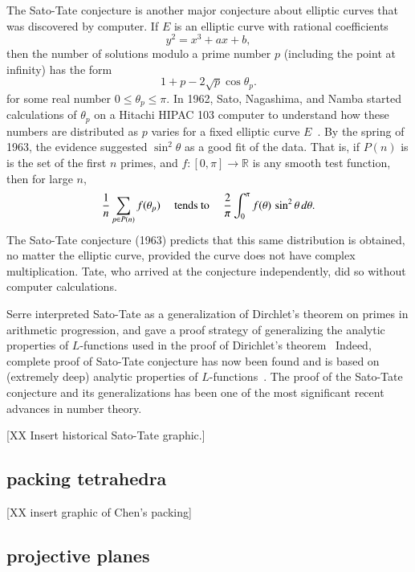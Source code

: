 \documentclass{llncs}
\newcommand{\ring}[1]{\mathbb{#1}}
\begin{document}
The Sato-Tate conjecture is another major conjecture about elliptic
curves that was discovered by computer.  If $E$ is an elliptic curve
with rational coefficients
\[
y^2 = x^3 + a x + b,
\]
then the number of solutions modulo a prime number $p$ (including the
point at infinity) has the form
\[
1 + p - 2\sqrt{p}\cos\theta_p.
\]
for some real number $0\le \theta_p\le \pi$.  In 1962, Sato,
Nagashima, and Namba started calculations  of $\theta_p$ on a Hitachi
HIPAC 103 computer to understand how these numbers are distributed as
$p$ varies for a fixed elliptic curve $E$~\cite{Sch}.  By the spring of 1963, the
evidence suggested  $\sin^2\theta$ as a good fit of the data.
That is, if $P(n)$ is is the set of the first $n$ primes, and
$f:[0,\pi]\to\ring{R}$ is any smooth test function, then for large
$n$,
\[
\frac{1}{n}\sum_{p\in P(n)} f(\theta_p) \quad\hbox{ tends to }\quad
\frac{2}{\pi}\int_0^\pi f(\theta)\,\sin^2\theta\,d\theta.
\]
The Sato-Tate conjecture (1963) predicts that this same distribution is
obtained, no matter the elliptic curve, provided the curve does not
have complex multiplication.  Tate, who arrived at the conjecture
independently, did so without computer calculations.

Serre interpreted Sato-Tate as a generalization of Dirchlet's
theorem on primes in arithmetic progression, and gave a proof strategy
of generalizing the analytic properties of $L$-functions used in
the proof of Dirichlet's theorem~\cite{Se68}  Indeed, complete proof of Sato-Tate
conjecture has now been found and is based on (extremely deep)
analytic properties of $L$-functions~\cite{Car:Bourbaki}.
The proof of the Sato-Tate conjecture and its generalizations has been
one of the most significant recent advances in number theory.

[XX Insert historical Sato-Tate graphic.]



\subsection{packing  tetrahedra}


[XX insert graphic of Chen's packing]

\subsection{projective planes}
\end{document}
